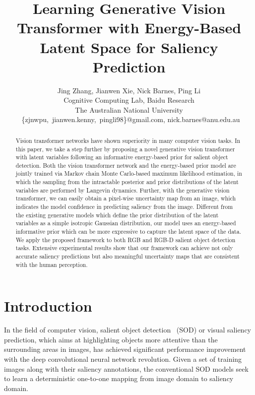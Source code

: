 \documentclass{article}
\title{
Learning Generative Vision Transformer with Energy-Based Latent Space for Saliency Prediction
}
\author{Jing Zhang,
  Jianwen Xie,
  Nick Barnes,
  Ping Li\\
 Cognitive Computing Lab, 
Baidu Research\\  The Australian National University \\
\ \{zjnwpu,\ jianwen.kenny,\ pingli98\}@gmail.com,  nick.barnes@anu.edu.au 
}
\begin{document}
\maketitle

\begin{abstract}
Vision transformer networks have shown superiority in many computer vision tasks. In this paper, we take a step further by proposing a novel generative vision transformer with latent variables following an informative energy-based prior for salient object detection. Both the vision transformer network and the energy-based prior model are jointly trained via Markov chain Monte Carlo-based maximum likelihood estimation, in which the sampling from the intractable posterior and prior distributions of the latent variables are performed by Langevin dynamics. Further, with the generative vision transformer, we can easily obtain a pixel-wise uncertainty map from an image, which indicates the model confidence in predicting saliency from the image. Different from the existing generative models which define the prior distribution of the latent variables as a simple isotropic Gaussian distribution, our model uses an energy-based informative prior which can be more expressive to capture the latent space of the data. We apply the proposed framework to both RGB and RGB-D salient object detection tasks.
Extensive experimental results show that our framework can achieve not only accurate saliency predictions but also meaningful uncertainty maps that are consistent with the human perception. 
\end{abstract}

\section{Introduction}\label{intro_sec}

In the field of computer vision, salient object detection~\cite{wei2020f3net,wei2020label,fan2020bbs,Fu2020JLDCF,chen2018progressively,jing2020weakly} (SOD) or visual saliency prediction, which aims at highlighting objects more attentive than the surrounding areas in images, has achieved significant performance improvement with the deep convolutional neural network revolution.
Given a set of training images along with their saliency annotations, the conventional SOD models seek to learn a deterministic one-to-one mapping from image domain to saliency domain.
\end{document}
